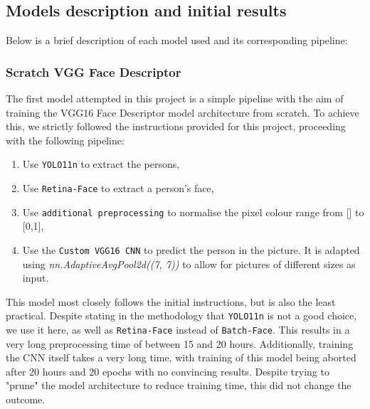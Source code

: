 \documentclass[9pt,twocolumn,twoside]{ilcss}
\theoremstyle{definition}
\theoremstyle{remark}
\theoremstyle{definition}
\theoremstyle{definition}
\begin{document}
    \subsection{Models description and initial results}
    Below is a brief description of each model used and its corresponding pipeline:
    
    \subsubsection*{Scratch VGG Face Descriptor} The first model attempted in this project is a simple pipeline with the aim of training the VGG16 Face Descriptor model architecture from scratch.
    To achieve this, we strictly followed the instructions provided for this project, proceeding with the following pipeline:
    \begin{enumerate}[noitemsep, partopsep=0pt]
        \item Use \texttt{YOLO11n} to extract the persons,
        \item Use \texttt{Retina-Face} to extract a person's face,
        \item Use \texttt{additional preprocessing} to normalise the pixel colour range from [\![0,255]\!] to [0,1],
        \item Use the \texttt{Custom VGG16 CNN} to predict the person in the picture. It is adapted using \textit{nn.AdaptiveAvgPool2d((7, 7))} to allow for pictures of different sizes as input.
    \end{enumerate} 

    This model most closely follows the initial instructions, but is also the least practical. 
    Despite stating in the methodology that \texttt{YOLO11n} is not a good choice, we use it here, as well as \texttt{Retina-Face} instead of \texttt{Batch-Face}. This results in a very long preprocessing time of between 15 and 20 hours.
    Additionally, training the CNN itself takes a very long time, with training of this model being aborted after 20 hours and 20 epochs with no convincing results. 
    Despite trying to "prune" the model architecture to reduce training time, this did not change the outcome.     
\end{document}
